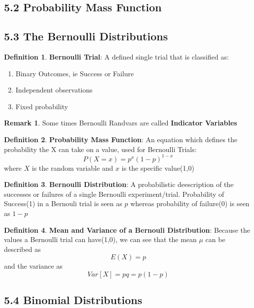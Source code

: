 \documentclass[12pt]{amsart}
\theoremstyle{definition}
\newtheorem{definition}{Definition} %
\newtheorem*{remark}{Remark}        %
\numberwithin{equation}{theorem}    %
\begin{document}
\subsection*{5.2 Probability Mass Function}

\subsection*{5.3 The Bernoulli Distributions}

\begin{definition}
    \textbf{Bernoulli Trial}:
    A defined single trial that is classified as:
    \begin{enumerate}
        \item Binary Outcomes, ie Success or Failure
        \item Independent observations
        \item Fixed probability
    \end{enumerate}
    \begin{remark}
        Some times Bernoulli Randvars are called \textbf{Indicator Variables}
    \end{remark}
\end{definition}



\begin{definition}
    \textbf{Probability Mass Function}:
    An equation which defines the probability the X can take on a value, used for Bernoulli Trials:
    $$P(X=x) = p^x(1-p)^{1-x}$$ where $X$ is the random variable and $x$ is the specific value(1,0)
\end{definition}

\begin{definition}
    \textbf{Bernoulli Distribution}:
    A probabilistic deescription of the successes or failures of a single Bernoulli experiment/trial. Probability of Success(1) in a Bernouli trial is seen as $p$ whereas probability of failure(0) is seen as $1-p$
\end{definition}

\begin{definition}
    \textbf{Mean and Variance of a Bernouli Distribution}:
    Because the values a Bernoulli trial can have(1,0), we can see that the mean $\mu$ can be described as $$E(X) = p$$ and the variance as $$Var[X] = pq=p(1-p)$$
\end{definition}

\subsection*{5.4 Binomial Distributions}
\end{document}
